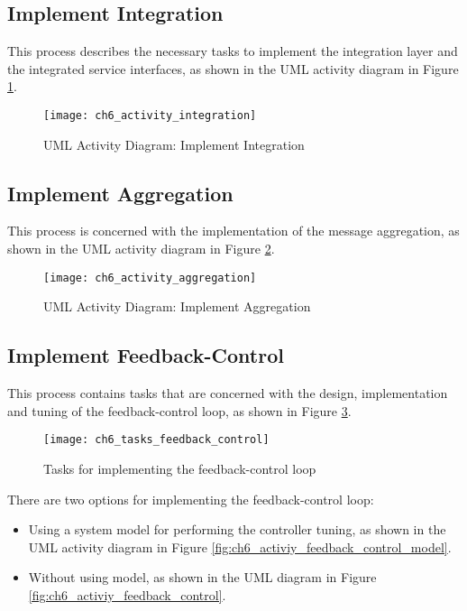 \subsection{Implement Integration}
This process describes the necessary tasks to implement the integration layer and the integrated service interfaces, as shown in the \ac{UML} activity diagram in Figure \ref{fig:ch6_activiy_integration}.

\begin{figure}[htpb] \centering 
	\texttt{[image: ch6\_activity\_integration]} 
	\caption{\ac{UML} Activity Diagram: Implement Integration} 
	\label{fig:ch6_activiy_integration} 
\end{figure}

\subsection{Implement Aggregation}
This process is concerned with the implementation of the message aggregation, as shown in the \ac{UML} activity diagram in Figure \ref{fig:ch6_activiy_aggregation}.

\begin{figure}[htpb] \centering 
	\texttt{[image: ch6\_activity\_aggregation]} 
	\caption{\ac{UML} Activity Diagram: Implement Aggregation} 
	\label{fig:ch6_activiy_aggregation} 
\end{figure}

\subsection{Implement Feedback-Control}

This process contains tasks that are concerned with the design, implementation and tuning of the feedback-control loop, as shown in Figure \ref{fig:ch6_tasks_feedback_control}.

\begin{figure}[htpb] \centering 
	\texttt{[image: ch6\_tasks\_feedback\_control]} 
	\caption{Tasks for implementing the feedback-control loop} 
	\label{fig:ch6_tasks_feedback_control} 
\end{figure}

There are two options for implementing the feedback-control loop:
\begin{itemize}
	\item Using a system model for performing the controller tuning, as shown in the \ac{UML} activity diagram in Figure \ref{fig:ch6_activiy_feedback_control_model}.
	\item Without using model, as shown in the \ac{UML} diagram in Figure \ref{fig:ch6_activiy_feedback_control}.
\end{itemize}

